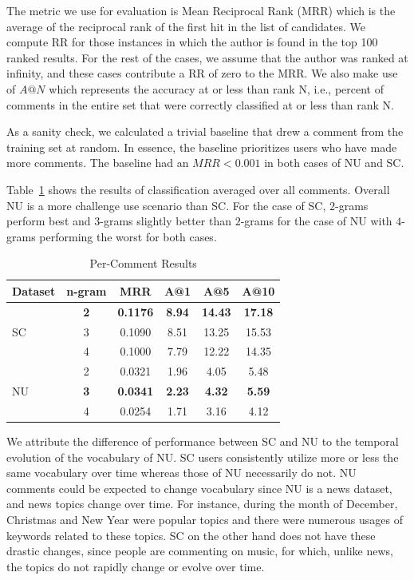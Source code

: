 The metric we use for evaluation is Mean Reciprocal Rank (MRR) which is %
the average of the reciprocal rank of the first hit in the list of candidates. We compute RR for those instances in which the author is found in the top 100 ranked results. For the rest of the cases, we assume that the author was ranked at infinity, and these cases contribute a RR of zero to the MRR. We also make use of $A@N$ which represents the accuracy at or less than rank N, i.e., percent of comments in the entire set that were correctly classified at or less than rank N.

As a sanity check, we calculated a trivial baseline that drew a comment from the training set at random. In essence, the baseline prioritizes users who have made more comments. The baseline had an $MRR < 0.001$ in both cases of NU and SC.

Table~\ref{tab:com_results} shows the results of classification averaged over all comments. 
Overall NU is a more challenge use scenario than SC. 
For the case of SC, $2$-grams perform best and $3$-grams slightly better than $2$-grams for the case of NU with $4$-grams performing the worst for both cases.

\begin{table}[!h]
\centering
\begin{tabular}{|l|c|c|c|c|c|}
\hline
 \textbf{Dataset} & \textbf{n-gram} & \textbf{MRR} & \textbf{A@1} & \textbf{A@5} & \textbf{A@10}\\ \hline
 \multirow{3}{*}{SC} & \textbf{2} & \textbf{0.1176} & \textbf{8.94} & \textbf{14.43} & \textbf{17.18}\\ \cline{2-6}
 & 3 & 0.1090 & 8.51 & 13.25 & 15.53\\ \cline{2-6}
 & 4 & 0.1000 & 7.79 & 12.22 & 14.35\\ \hline
 \multirow{3}{*}{NU} & 2 & 0.0321 & 1.96 & 4.05 & 5.48\\ \cline{2-6}
 & \textbf{3} & \textbf{0.0341} & \textbf{2.23} & \textbf{4.32} & \textbf{5.59}\\ \cline{2-6}
 & 4 & 0.0254 & 1.71 & 3.16 & 4.12\\ \hline
\end{tabular}
\caption{Per-Comment Results}
\label{tab:com_results}
\end{table}

We attribute the difference of performance between SC and NU to the temporal evolution of the vocabulary of NU. SC users consistently utilize more or less the same vocabulary over time whereas those of NU necessarily do not. NU comments could be expected to change vocabulary since NU is a news dataset, and news topics change over time. For instance, during the month of December, Christmas and New Year were popular topics and there were numerous usages of keywords related to these topics.
SC on the other hand does not have these drastic changes, since people are commenting on music, for which, unlike news, the topics do not rapidly change or evolve over time.

